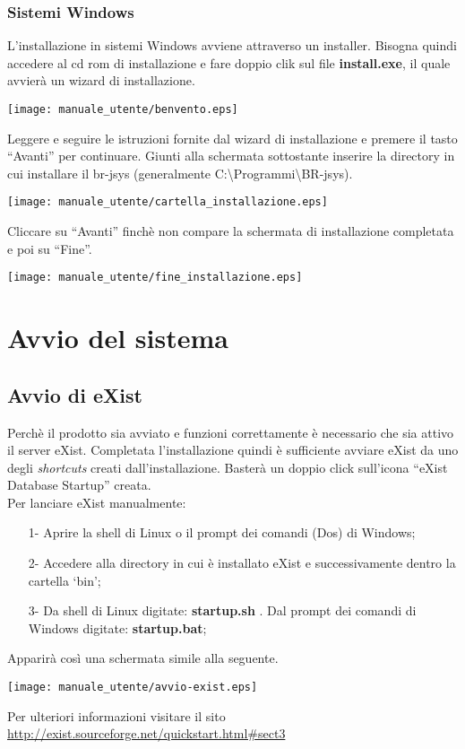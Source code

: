 \subsection{Sistemi Windows}
L'installazione in sistemi Windows avviene attraverso un installer. Bisogna quindi accedere al cd rom di installazione e fare doppio clik sul file  \textbf{install.exe}, il quale avvier\`a un wizard di installazione.
\begin{center}
\texttt{[image: manuale\_utente/benvento.eps]}\\
\end{center}
Leggere e seguire le istruzioni fornite dal wizard di installazione e premere il tasto ``Avanti'' per continuare.
Giunti alla schermata sottostante inserire la directory in cui installare il br-jsys (generalmente C:\textbackslash Programmi\textbackslash BR-jsys).
\begin{center}
\texttt{[image: manuale\_utente/cartella\_installazione.eps]}\\
\end{center}
Cliccare su ``Avanti'' finch\`e non compare la schermata di installazione completata e poi su ``Fine''.
\begin{center}
\texttt{[image: manuale\_utente/fine\_installazione.eps]}\\
\end{center}

\chapter{Avvio del sistema}
\section{Avvio di eXist}
Perch\`e il prodotto sia avviato e funzioni correttamente \`e necessario che sia attivo il server eXist. Completata l'installazione quindi è sufficiente avviare eXist da uno degli \textit{shortcuts} creati dall'installazione. Baster\`a un doppio click sull'icona ``eXist Database Startup'' creata.\\
Per lanciare eXist manualmente:
\begin{itemize}
\item[1-] Aprire la shell di Linux o il prompt dei comandi (Dos) di Windows;
\item[2-] Accedere alla directory in cui \`e installato eXist e successivamente dentro la cartella `bin';
\item[3-] Da shell di Linux digitate:  \textbf{startup.sh} . Dal prompt dei comandi di Windows digitate: \textbf{startup.bat};
\end{itemize}	
Apparir\`a cos\`i una schermata simile alla seguente.
\begin{center}
\texttt{[image: manuale\_utente/avvio-exist.eps]}\\
\end{center}
Per ulteriori informazioni visitare il sito\\
 \href{http://exist.sourceforge.net/quickstart.html\#sect3}{ http://exist.sourceforge.net/quickstart.html\#sect3}


